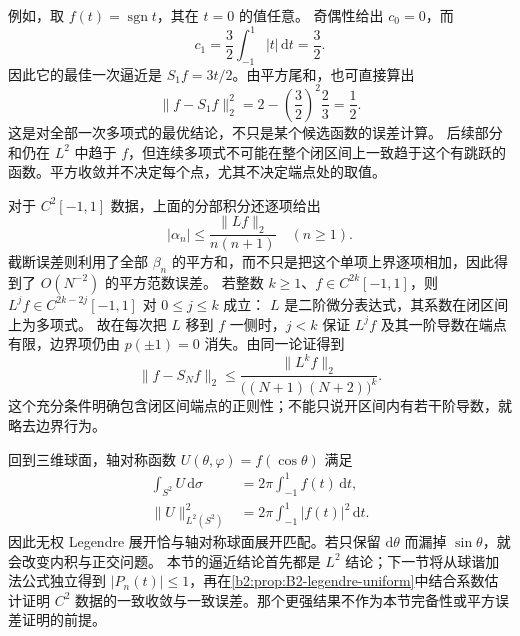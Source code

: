 例如，取 \(f(t)=\operatorname{sgn}t\)，其在 \(t=0\) 的值任意。
奇偶性给出 \(c_0=0\)，而
\[
 c_1=\frac32\int_{-1}^1|t|\,\mathrm dt=\frac32.
\]
因此它的最佳一次逼近是 \(S_1f=3t/2\)。由平方尾和，也可直接算出
\[
 \|f-S_1f\|_2^2
 =2-\left(\frac32\right)^2\frac23=\frac12.
\]
这是对全部一次多项式的最优结论，不只是某个候选函数的误差计算。
后续部分和仍在 \(L^2\) 中趋于 \(f\)，但连续多项式不可能在整个闭区间上一致趋于这个有跳跃的函数。平方收敛并不决定每个点，尤其不决定端点处的取值。

\ProseParagraphBreak

对于 \(C^2[-1,1]\) 数据，上面的分部积分还逐项给出
\[
 |\alpha_n|
 \le\frac{\|Lf\|_2}{n(n+1)}
 \quad(n\ge1).
\]
截断误差则利用了全部 \(\beta_n\) 的平方和，而不只是把这个单项上界逐项相加，因此得到了
\(O(N^{-2})\) 的平方范数误差。
若整数 \(k\ge1\)、\(f\in C^{2k}[-1,1]\)，则
\(L^jf\in C^{2k-2j}[-1,1]\) 对 \(0\le j\le k\) 成立：
\(L\) 是二阶微分表达式，其系数在闭区间上为多项式。
故在每次把 \(L\) 移到 \(f\) 一侧时，\(j<k\) 保证
\(L^jf\) 及其一阶导数在端点有限，边界项仍由 \(p(\pm1)=0\) 消失。由同一论证得到
\[
 \|f-S_Nf\|_2
 \le\frac{\|L^kf\|_2}{\bigl((N+1)(N+2)\bigr)^k}.
\]
这个充分条件明确包含闭区间端点的正则性；不能只说开区间内有若干阶导数，就略去边界行为。

\ProseParagraphBreak

回到三维球面，轴对称函数
\(U(\theta,\varphi)=f(\cos\theta)\) 满足
\[
\begin{aligned}
 \int_{S^2}U\,\mathrm d\sigma
 &=2\pi\int_{-1}^1f(t)\,\mathrm dt,\\
 \|U\|_{L^2(S^2)}^2
 &=2\pi\int_{-1}^1|f(t)|^2\,\mathrm dt.
\end{aligned}
\]
因此无权 Legendre 展开恰与轴对称球面展开匹配。若只保留
\(\mathrm d\theta\) 而漏掉 \(\sin\theta\)，就会改变内积与正交问题。
本节的逼近结论首先都是 \(L^2\) 结论；下一节将从球谐加法公式独立得到
\(|P_n(t)|\le1\)，再在\cref{b2:prop:B2-legendre-uniform}中结合系数估计证明
\(C^2\) 数据的一致收敛与一致误差。那个更强结果不作为本节完备性或平方误差证明的前提。
